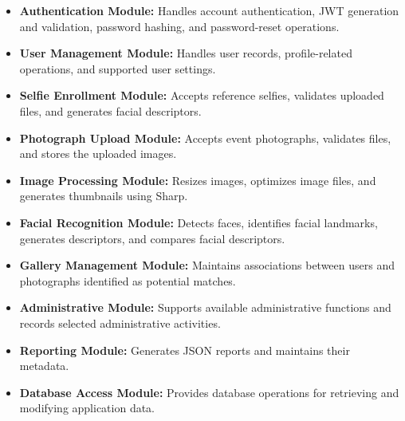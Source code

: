 
\clearpage
{}



\begin{itemize}
    \item \textbf{Authentication Module:} Handles account authentication, JWT generation and validation, password hashing, and password-reset operations.
    \item \textbf{User Management Module:} Handles user records, profile-related operations, and supported user settings.
    \item \textbf{Selfie Enrollment Module:} Accepts reference selfies, validates uploaded files, and generates facial descriptors.
    \item \textbf{Photograph Upload Module:} Accepts event photographs, validates files, and stores the uploaded images.
    \item \textbf{Image Processing Module:} Resizes images, optimizes image files, and generates thumbnails using Sharp.
    \item \textbf{Facial Recognition Module:} Detects faces, identifies facial landmarks, generates descriptors, and compares facial descriptors.
    \item \textbf{Gallery Management Module:} Maintains associations between users and photographs identified as potential matches.
    \item \textbf{Administrative Module:} Supports available administrative functions and records selected administrative activities.
    \item \textbf{Reporting Module:} Generates JSON reports and maintains their metadata.
    \item \textbf{Database Access Module:} Provides database operations for retrieving and modifying application data.
\end{itemize}

